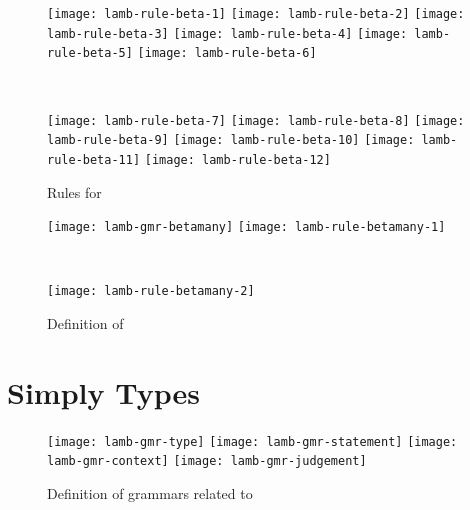 \documentclass[master.tex]{subfiles}
\begin{document}
\begin{figure}[H]
    \centering

\begin{minipage}{0.48\textwidth}
\begin{flushleft}
\texttt{[image: lamb-rule-beta-1]}
\texttt{[image: lamb-rule-beta-2]}
\texttt{[image: lamb-rule-beta-3]}
\texttt{[image: lamb-rule-beta-4]}
\texttt{[image: lamb-rule-beta-5]}
\texttt{[image: lamb-rule-beta-6]}
\end{flushleft}
\end{minipage}
~
\begin{minipage}{0.48\textwidth}
\begin{flushright}
\texttt{[image: lamb-rule-beta-7]}
\texttt{[image: lamb-rule-beta-8]}
\texttt{[image: lamb-rule-beta-9]}
\texttt{[image: lamb-rule-beta-10]}
\texttt{[image: lamb-rule-beta-11]}
\texttt{[image: lamb-rule-beta-12]}
\end{flushright}
\end{minipage}

    \caption{Rules for }
\end{figure}


\begin{figure}[H]
    \centering
\begin{minipage}{0.48\textwidth}
\begin{flushleft}
\texttt{[image: lamb-gmr-betamany]}
\texttt{[image: lamb-rule-betamany-1]}
\end{flushleft}
\end{minipage}
~
\begin{minipage}{0.48\textwidth}
\begin{flushright}
\texttt{[image: lamb-rule-betamany-2]}
\end{flushright}
\end{minipage}

\caption{Definition of }
\end{figure}

\section{Simply Types}


\begin{figure}[H]
    \centering
\begin{minipage}{0.7\textwidth}
    \texttt{[image: lamb-gmr-type]}
    \texttt{[image: lamb-gmr-statement]}
    \texttt{[image: lamb-gmr-context]}
    \texttt{[image: lamb-gmr-judgement]}
\end{minipage}
\caption{Definition of grammars related to }
\end{figure}
\end{document}
